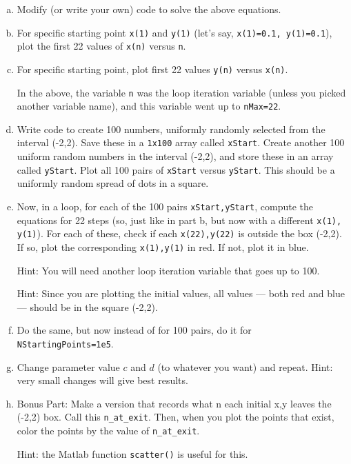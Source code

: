 \documentclass{exam}
\begin{document}
\begin{enumerate}[a.]
\item Modify (or write your own) code to solve the above equations.
\item For specific starting point \verb|x(1)| and \verb|y(1)| (let's say, \verb|x(1)=0.1, y(1)=0.1|), plot the first 22 values of \verb|x(n)| versus \verb|n|.
\item For specific starting point, plot first 22 values \verb|y(n)| versus \verb|x(n)|.

In the above, the variable \verb|n| was the loop iteration variable (unless you picked another variable name), and this variable went up to \verb|nMax=22|.

\item Write code to create 100 numbers, uniformly randomly selected from the interval (-2,2). Save these in a \verb|1x100| array called \verb|xStart|. Create another 100 uniform random numbers in the interval (-2,2), and store these in an array called \verb|yStart|. Plot all 100 pairs of \verb|xStart| versus \verb|yStart|.  This should be a uniformly random spread of dots in a square. 

\item Now, in a loop, for each of the 100 pairs \verb|xStart,yStart|, compute the equations for 22 steps (so, just like in part b, but now with a different \verb|x(1), y(1)|). For each of these, check if each \verb|x(22),y(22)| is outside the box (-2,2). If so, plot the corresponding \verb|x(1),y(1)| in red. If not, plot it in blue. 

Hint: You will need another loop iteration variable that goes up to 100.

Hint: Since you are plotting the initial values, all values --- both red and blue --- should be in the square (-2,2). 

\item Do the same, but now instead of for 100 pairs, do it for \verb|NStartingPoints=1e5|.  
\item Change parameter value $c$ and $d$ (to whatever you want) and repeat. Hint: very small changes will give best results.
\item Bonus Part: Make a version that records what n each initial x,y leaves the (-2,2) box. Call this \verb|n_at_exit|. Then, when you plot the points that exist, color the points by the value of \verb|n_at_exit|.

Hint: the Matlab function \verb|scatter()| is useful for this.
\end{enumerate}




\end{document}
